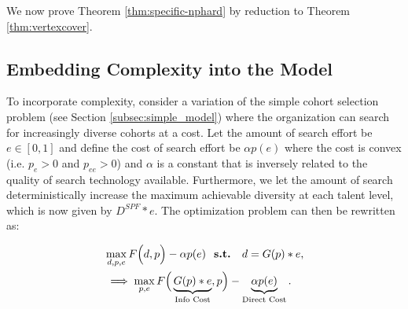 We now prove Theorem \ref{thm:specific-nphard} by reduction to Theorem \ref{thm:vertexcover}.




\subsection{Embedding Complexity into the Model}\label{subsec:dts_w_complexity}

To incorporate complexity, consider a variation of the simple cohort selection problem (see Section \ref{subsec:simple_model}) where the organization can search for increasingly diverse cohorts at a cost. Let the amount of search effort be $e\in[0,1]$ and define the cost of search effort be $\alpha p(e)$ where the cost is convex (i.e. $p_e>0$ and $p_{ee}>0$) and $\alpha$ is a constant that is inversely related to the quality of search technology available. Furthermore, we let the amount of search deterministically increase the maximum achievable diversity at each talent level, which is now given by $D^{SPF}*e$. The optimization problem can then be rewritten as:

\begin{align}
&\max_{d,p,e} F\Big(d,p\Big) - \alpha p(e) \text{ \bf{ s.t. } } d = G(p)*e, \nonumber \\ 
& \implies \max_{p,e} F\Big(\underbrace{G(p)*e}_{\text{Info Cost}} ,p\Big) - \underbrace{\alpha p(e)}_{\text{Direct Cost}}. \label{eq:objective}
\end{align}

